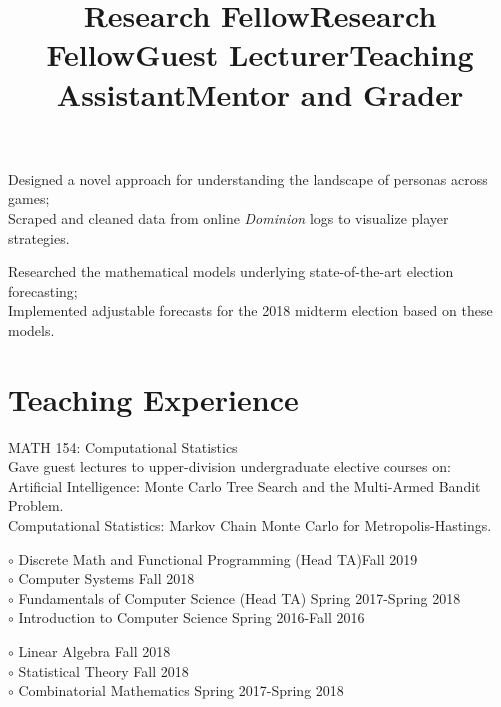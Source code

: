 \documentclass[margin]{res}
\begin{document}
\begin{resume}
\title{\textbf{Research Fellow}}
\begin{position}
Designed a novel approach for understanding the landscape of personas across games;\\
Scraped and cleaned data from online \emph{Dominion} logs to visualize player strategies.
\end{position}

\title{\textbf{Research Fellow}}
\begin{position}
Researched the mathematical models underlying state-of-the-art election forecasting;\\
Implemented adjustable forecasts for the 2018 midterm election based on these models.
\end{position}

\section{Teaching Experience}
\title{\textbf{Guest Lecturer}}
\begin{position}
MATH 154: Computational Statistics\\
Gave guest lectures to upper-division undergraduate elective courses on:\\
Artificial Intelligence: Monte Carlo Tree Search and the Multi-Armed Bandit Problem.\\
Computational Statistics: Markov Chain Monte Carlo for Metropolis-Hastings.
\end{position}

\dates{}
\title{\textbf{Teaching Assistant}}
\begin{position}
$\circ$ Discrete Math and Functional Programming (Head TA)\hfill Fall 2019\\
$\circ$ Computer Systems \hfill Fall 2018\\
$\circ$ Fundamentals of Computer Science (Head TA) \hfill Spring 2017-Spring 2018\\
$\circ$ Introduction to Computer Science \hfill Spring 2016-Fall 2016

\end{position}

\dates{}
\title{\textbf{Mentor and Grader}}
\begin{position}
$\circ$ Linear Algebra \hfill Fall 2018\\
$\circ$ Statistical Theory \hfill Fall 2018\\
$\circ$ Combinatorial Mathematics \hfill Spring 2017-Spring 2018


\end{position}
\end{resume}
\end{document}
